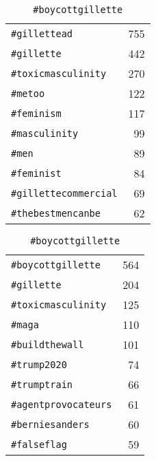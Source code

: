 \begin{table}[H]
\begin{subtable}{.25\linewidth}
\begin{tabular}{lr}
\texttt{\#gillettead}         & 755 \\
\texttt{\#gillette}           & 442 \\
\texttt{\#toxicmasculinity}   & 270 \\
\texttt{\#metoo}              & 122 \\
\texttt{\#feminism}           & 117 \\
\texttt{\#masculinity}        & 99 \\
\texttt{\#men}                & 89 \\
\texttt{\#feminist}           & 84 \\
\texttt{\#gillettecommercial} & 69 \\
\texttt{\#thebestmencanbe}    & 62

\end{tabular}
    \end{subtable}%
    \begin{subtable}{.25\linewidth}
\centering
\captionsetup{justification=centering,singlelinecheck=off}
\caption{
  \texttt{\#boycottgillette}
}
\begin{tabular}{lr}

\texttt{\#boycottgillette}   & 564 \\
\texttt{\#gillette}          & 204 \\
\texttt{\#toxicmasculinity}  & 125 \\
\texttt{\#maga}              & 110 \\
\texttt{\#buildthewall}      & 101 \\
\texttt{\#trump2020}         & 74 \\
\texttt{\#trumptrain}        & 66 \\
\texttt{\#agentprovocateurs} & 61 \\
\texttt{\#berniesanders}     & 60 \\
\texttt{\#falseflag}         & 59

\end{tabular}
    \end{subtable}
\end{table}
